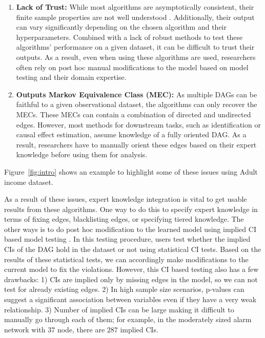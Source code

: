 \documentclass{uai2025} %
\begin{document}
\begin{enumerate}
	\item \textbf{Lack of Trust:} While most algorithms are
		asymptotically consistent, their finite sample properties are
		not well understood .
		Additionally, their output can vary significantly depending on
		the chosen algorithm and their hyperparameters. Combined with a
		lack of robust methods to test these algorithms' performance on
		a given dataset, it can be difficult to trust their outputs. As
		a result, even when using these algorithms are used,
		researchers often rely on post hoc manual modifications to the
		model based on model testing and their domain expertise.
	\item \textbf{Outputs Markov Equivalence Class (MEC):} As multiple
		DAGs can be faithful to a given observational dataset, the
		algorithms can only recover the MECs. These MECs can contain a
		combination of directed and undirected edges. However, most
		methods for downstream tasks, such as identification or causal
		effect estimation, assume knowledge of a fully oriented DAG. As
		a result, researchers have to manually orient these edges based
		on their expert knowledge before using them for analysis.
\end{enumerate}

Figure~\ref{fig:intro} shows an example to highlight some of these issues using 
Adult income dataset.


As a result of these issues, expert knowledge integration is vital to get usable 
results from these algorithms.
One way to do this to specify expert knowledge in terms of
fixing edges, blacklisting edges, or specifying tiered knowledge.
The other ways is to do post hoc modification to the learned model using
implied CI based model testing \citep{Ankan2021, Ankan2023}. In this testing
procedure, users test whether the implied CIs of the DAG hold in the dataset or
not using statistical CI tests. Based on the results of these statistical
tests, we can accordingly make modifications to the current model to fix the
violations. However, this CI based testing also has a few drawbacks: 1) CIs are
implied only by missing edges in the model, so we can not test for already
existing edges. 2) In high sample size scenarios, p-values can suggest a
significant association between variables even if they have a very weak
relationship. 3) Number of implied CIs can be large making it difficult to
manually go through each of them; for example, in the moderately sized alarm
network with $ 37 $ node, there are $287$ implied CIs. 
\end{document}
